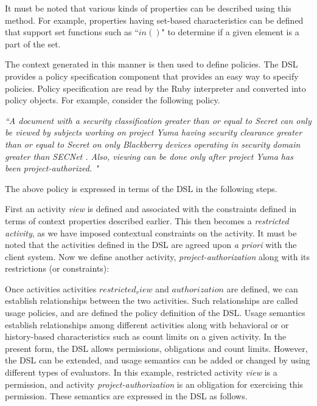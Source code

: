 It must be noted that various kinds of properties can be described using this method. For example, properties having set-based characteristics can be defined that support set functions such as ``$in()$" to determine if a given element is a part of the set. 

The context generated in this manner is then used to define policies. The DSL provides a policy specification component that provides an easy way to specify policies. Policy specification are read by the Ruby interpreter and converted into policy objects. For example, consider the following policy. 

{\em ``A document with a security classification greater than or equal to Secret can only be viewed by subjects working on project Yuma having security clearance greater than or equal to Secret on only Blackberry devices operating in security domain greater than SECNet . Also, viewing can be done only after project Yuma has been project-authorized. "}

The above policy is expressed in terms of the DSL in the following steps. 



First an activity {\em view} is defined and associated with the constraints defined in terms of context properties described earlier.  This then becomes a {\em restricted activity}, as we have imposed contextual constraints on the activity.  It must be noted that the activities defined in the DSL are agreed upon {\em a priori} with the client system. Now we define another activity, {\em project-authorization} along with its restrictions (or constraints):



Once activities activities $restricted_view$ and $authorization$ are defined, we can establish relationships between the two activities. Such relationships are called usage policies, and are defined the policy definition of the DSL. Usage semantics establish relationships among different activities along with behavioral or or history-based characteristics such as count limits on a given activity. In the present form, the DSL allows permissions, obligations and count limits. However, the DSL can be extended, and usage semantics can be added or changed by using different types of evaluators. In this example, restricted activity {\em view} is a permission, and activity {\em project-authorization} is an obligation for exercising this permission. These semantics are expressed in the DSL as follows. 

